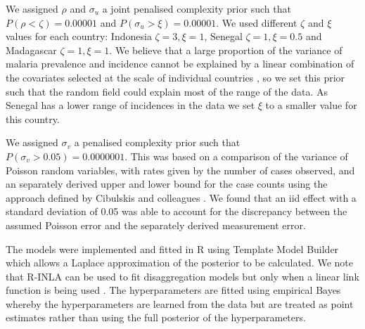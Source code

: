\documentclass{statsoc}
\begin{document}
We assigned $\rho$ and $\sigma_u$ a joint penalised complexity prior \citep{fuglstad2018constructing} such that $P(\rho < \zeta) = 0.00001$ and $P(\sigma_u > \xi) = 0.00001$.
We used different $\zeta$  and $\xi$ values for each country: Indonesia $\zeta = 3, \xi = 1$, Senegal $\zeta = 1, \xi = 0.5$ and Madagascar $\zeta = 1, \xi = 1$.
We believe that a large proportion of the variance of malaria prevalence and incidence cannot be explained by a linear combination of the covariates selected at the scale of individual countries \citep{bhatt2017improved}, so we set this prior such that the random field could explain most of the range of the data.
As Senegal has a lower range of incidences in the data we set $\xi$ to a smaller value for this country.

We assigned $\sigma_v$ a penalised complexity prior \citep{simpson2017penalising} such that $P(\sigma_v > 0.05) = 0.0000001$.
This was based on a comparison of the variance of Poisson random variables, with rates given by the number of cases observed, and an separately derived upper and lower bound for the case counts using the approach defined by Cibulskis and colleagues \citep{cibulskis2011worldwide}.
We found that an iid effect with a standard deviation of 0.05 was able to account for the discrepancy between the assumed Poisson error and the separately derived measurement error.

The models were implemented and fitted in R \citep{R} using Template Model Builder \citep{TMB} which allows a Laplace approximation of the posterior to be calculated.
We note that R-INLA \citep{INLA} can be used to fit disaggregation models but only when a linear link function is being used \cite{wilson2017pointless}.
The hyperparameters are fitted using empirical Bayes whereby the hyperparameters are learned from the data but are treated as point estimates rather than using the full posterior of the hyperparameters.


%
%
%
%
%
%
%
\end{document}
